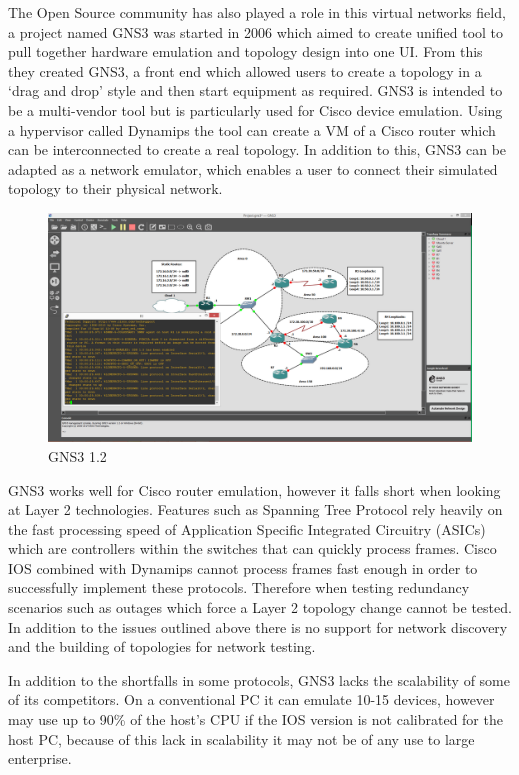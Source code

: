 \documentclass[11pt]{report}
\begin{document}
The Open Source community has also played a role in this virtual networks field, a project named GNS3 \citep{GNS31.2} was started in 2006 which aimed to create  unified tool to pull together hardware emulation and topology design into one UI. From this they created GNS3, a front end which allowed users to create a topology in a ‘drag and drop’ style and then start equipment as required. GNS3 is intended to be a multi-vendor tool but is particularly used for Cisco device emulation. Using a hypervisor called Dynamips the tool can create a VM of a Cisco router which can be interconnected to create a real topology. In addition to this, GNS3 can be adapted as a network emulator, which enables a user to connect their simulated topology to their physical network.

\begin{figure}[h!]
	\caption{GNS3 1.2}
	\centering
	\includegraphics[width=1\textwidth]{GNS3.png}
\end{figure}

GNS3 works well for Cisco router emulation, however it falls short when looking at Layer 2 technologies. Features such as Spanning Tree Protocol rely heavily on the fast processing speed of Application Specific Integrated Circuitry (ASICs) which are controllers within the switches that can quickly process frames. Cisco IOS combined with Dynamips cannot process frames fast enough in order to successfully implement these protocols. Therefore when testing redundancy scenarios such as outages which force a Layer 2 topology change cannot be tested. In addition to the issues outlined above there is no support for network discovery and the building of topologies for network testing.

In addition to the shortfalls in some protocols, GNS3 lacks the scalability of some of its competitors. On a conventional PC it can emulate 10-15 devices, however may use up to 90\% of the host's CPU if the IOS version is not calibrated for the host PC, because of this lack in scalability it may not be of any use to large enterprise.
\end{document}
